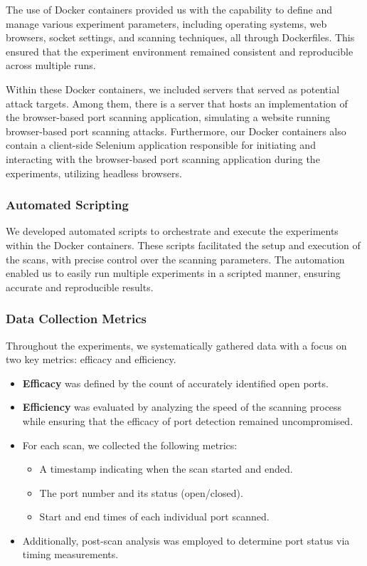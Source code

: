 The use of Docker containers provided us with the capability to define and manage various experiment parameters, including operating systems, web browsers, socket settings, and scanning techniques, all through Dockerfiles. This ensured that the experiment environment remained consistent and reproducible across multiple runs.

Within these Docker containers, we included servers that served as potential attack targets. Among them, there is a server that hosts an implementation of the browser-based port scanning application, simulating a website running browser-based port scanning attacks. Furthermore, our Docker containers also contain a client-side Selenium application responsible for initiating and interacting with the browser-based port scanning application during the experiments, utilizing headless browsers.

\subsubsection{Automated Scripting}

We developed automated scripts to orchestrate and execute the experiments within the Docker containers. These scripts facilitated the setup and execution of the scans, with precise control over the scanning parameters.
The automation enabled us to easily run multiple experiments in a scripted manner, ensuring accurate and reproducible results.

\subsubsection{Data Collection Metrics}

Throughout the experiments, we systematically gathered data with a focus on two key metrics: efficacy and efficiency.

\begin{itemize}
    \item \textbf{Efficacy} was defined by the count of accurately identified open ports.
    \item \textbf{Efficiency} was evaluated by analyzing the speed of the scanning process while ensuring that the efficacy of port detection remained uncompromised.
    \item For each scan, we collected the following metrics:
    \begin{itemize}
        \item A timestamp indicating when the scan started and ended.
        \item The port number and its status (open/closed).
        \item Start and end times of each individual port scanned.
    \end{itemize}
    \item Additionally, post-scan analysis was employed to determine port status via timing measurements.
\end{itemize}

